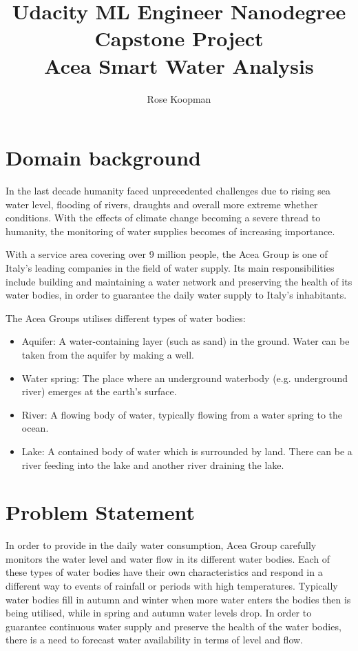 \documentclass[11pt]{article}
\begin{document}
\title{Udacity ML Engineer Nanodegree \\ Capstone Project \\ Acea Smart Water Analysis}
\author{Rose Koopman}
\date{}
\maketitle


\section{Domain background}

In the last decade humanity faced unprecedented challenges due to rising sea water level, flooding of rivers, draughts and overall more extreme whether conditions. With the effects of climate change becoming a severe thread to humanity, the monitoring of water supplies becomes of increasing importance. 

With a service area covering over 9 million people, the Acea Group \cite{acea} is one of Italy's leading companies in the field of water supply. Its main responsibilities include building and maintaining a water network and preserving the health of its water bodies,  in order to guarantee the daily water supply to Italy's inhabitants. 

The Acea Groups utilises different types of water bodies:

\begin{itemize}
\item Aquifer: A water-containing layer (such as sand) in the ground. Water can be taken from the aquifer by making a well. 
\item Water spring: The place where an underground waterbody (e.g. underground river) emerges at the earth's surface.
\item River: A flowing body of water, typically flowing from a water spring to the ocean.
\item Lake: A contained body of water which is surrounded by land. There can be a river feeding into the lake and another river draining the lake.
\end{itemize}

\section{Problem Statement}

In order to provide in the daily water consumption, Acea Group carefully monitors the water level and water flow in its different water bodies. Each of these types of water bodies have their own characteristics and respond in a different way to events of rainfall or periods with high temperatures. Typically water bodies fill in autumn and winter when more water enters the bodies then is being utilised, while in spring and autumn water levels drop. In order to guarantee continuous water supply and preserve the health of the water bodies, there is a need to forecast water availability in terms of level and flow.
\end{document}
